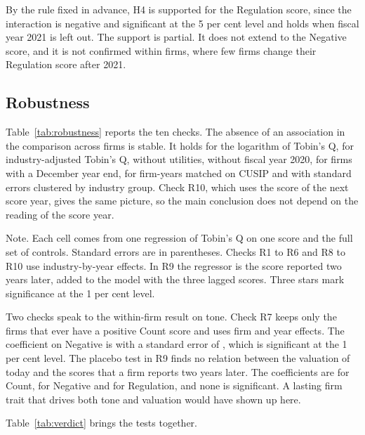 \documentclass[12pt,a4paper]{article}
\newcommand{\tablenote}[1]{\par\smallskip\begin{minipage}{\linewidth}\footnotesize\setstretch{1.05}#1\end{minipage}}
\newcommand{\widetable}[1]{\resizebox{\ifdim\width>\linewidth\linewidth\else\width\fi}{!}{}}
\begin{document}
By the rule fixed in advance, H4 is supported for the Regulation score, since the interaction is negative and significant at the 5 per cent level and holds when fiscal year 2021 is left out. The support is partial. It does not extend to the Negative score, and it is not confirmed within firms, where few firms change their Regulation score after 2021.

\subsection{Robustness}

Table~\ref{tab:robustness} reports the ten checks. The absence of an association in the comparison across firms is stable. It holds for the logarithm of Tobin's Q, for industry-adjusted Tobin's Q, without utilities, without fiscal year 2020, for firms with a December year end, for firm-years matched on CUSIP and with standard errors clustered by industry group. Check R10, which uses the score of the next score year, gives the same picture, so the main conclusion does not depend on the reading of the score year.

\begin{table}[!htbp]
\centering\small
\caption{Robustness checks}\label{tab:robustness}
\widetable{tables/tab_robustness}
\tablenote{Note. Each cell comes from one regression of Tobin's Q on one score and the full set of controls. Standard errors are in parentheses. Checks R1 to R6 and R8 to R10 use industry-by-year effects. In R9 the regressor is the score reported two years later, added to the model with the three lagged scores. Three stars mark significance at the 1 per cent level.}
\end{table}

Two checks speak to the within-firm result on tone. Check R7 keeps only the \nFirmsRSeven{} firms that ever have a positive Count score and uses firm and year effects. The coefficient on Negative is \coefRSevenNeg{} with a standard error of \seRSevenNeg{}, which is significant at the 1 per cent level. The placebo test in R9 finds no relation between the valuation of today and the scores that a firm reports two years later. The coefficients are \coefRNineCount{} for Count, \coefRNineNeg{} for Negative and \coefRNineReg{} for Regulation, and none is significant. A lasting firm trait that drives both tone and valuation would have shown up here.

Table~\ref{tab:verdict} brings the tests together.
\end{document}
